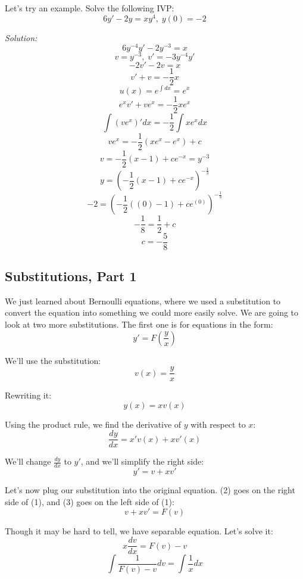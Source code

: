 	\pagebreak
	
	Let's try an example. Solve the following IVP:
	$$6y' - 2y = xy^{4},\;y(0) = -2$$
	
	\textit{Solution:}
	$$6y^{-4}y' - 2y^{-3} = x$$
	$$v = y^{-3},\;v' = -3y^{-4}y'$$
	$$-2v' - 2v = x$$
	$$v' + v = -\frac{1}{2}x$$
	$$u(x) = e^{\int dx} = e^{x}$$
	$$e^{x}v' + ve^{x} = -\frac{1}{2}xe^{x}$$
	$$\int (ve^{x})'dx = -\frac{1}{2}\int xe^{x}dx$$
	$$ve^{x} = -\frac{1}{2}(xe^{x} - e^{x}) + c$$
	$$v = -\frac{1}{2}(x - 1) + ce^{-x} = y^{-3}$$
	$$y = \left(-\frac{1}{2}(x - 1) + ce^{-x}\right)^{-\frac{1}{3}}$$
	$$-2 = \left(-\frac{1}{2}((0) - 1) + ce^{(0)}\right)^{-\frac{1}{3}}$$
	$$-\frac{1}{8} = \frac{1}{2} + c$$
	$$c = -\frac{5}{8}$$
	\begin{center}
	\end{center}
	
	\subsection{Substitutions, Part 1}
	We just learned about Bernoulli equations, where we used a substitution to convert the equation into something we could more easily solve. We are going to look at two more substitutions. The first one is for equations in the form:
	\begin{equation}
		y' = F\left(\frac{y}{x}\right)
	\end{equation}
	
	We'll use the substitution:
	\begin{equation}
		v(x) = \frac{y}{x}
	\end{equation}
	
	Rewriting it:
	$$y(x) = xv(x)$$
	
	Using the product rule, we find the derivative of $y$ with respect to $x$:
	$$\frac{dy}{dx} = x'v(x) + xv'(x)$$
	
	We'll change $\frac{dy}{dx}$ to $y'$, and we'll simplify the right side:
	\begin{equation}
		y' = v + xv'
	\end{equation}
	
	Let's now plug our substitution into the original equation. (2) goes on the right side of (1), and (3) goes on the left side of (1):
	$$v + xv' = F(v)$$
	
	Though it may be hard to tell, we have separable equation. Let's solve it:
	$$x\frac{dv}{dx} = F(v) - v$$
	$$\int \frac{1}{F(v) - v}dv = \int \frac{1}{x}dx$$
	
